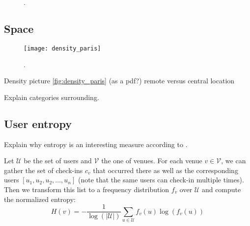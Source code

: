 \begin{figure}[hbt]
    \begin{subfigure}[b]{0.4\textwidth}
    \centering
    \iftoggle{EXTERNALPGF}{\texttt{[image: cluster\_day\_3h\_cl4]}}{}
    \end{subfigure}~
    \begin{subfigure}[b]{0.4\textwidth}
    \centering
    \iftoggle{EXTERNALPGF}{\texttt{[image: cluster\_day\_4h\_cl4]}}{}
    \end{subfigure}

    \begin{subfigure}[b]{0.4\textwidth}
    \centering
    \iftoggle{EXTERNALPGF}{\texttt{[image: cluster\_day\_3h\_cl5]}}{}
    \end{subfigure}~
    \begin{subfigure}[b]{0.4\textwidth}
    \centering
    \iftoggle{EXTERNALPGF}{\texttt{[image: cluster\_day\_4h\_cl5]}}{}
    \end{subfigure}
    \caption{.\label{fig:time_cluster_size}}
\end{figure}
\restoregeometry

\subsection{Space}

\begin{figure}[hbtp]
\texttt{[image: density\_paris]}
\caption[Venue density in Paris]{.\label{fig:density_paris}}
\end{figure}

Density picture \autoref{fig:density_paris} (as a pdf?) remote versus central
location

Explain categories surrounding.

\subsection{User entropy}

Explain why entropy is an interesting measure according to
\autocite{Entropy10}.

Let $\mathcal{U}$ be the set of users and $\mathcal{V}$ the one of venues. For
each venue $v \in \mathcal{V}$, we can gather the set of check-ins $c_v$ that
occurred there as well as the corresponding users $[u_1, u_2, u_2, \ldots,
u_n]$ (note that the same users can check-in multiple times). Then we
transform this list to a frequency distribution $f_v$ over $\mathcal{U}$ and
compute the normalized entropy: \[
    H(v) = -\frac{1}{\log\left(\left| \mathcal{U}\right|\right)}
\sum_{u\in \mathcal{U}} f_v(u) \log(f_v(u)) \]

